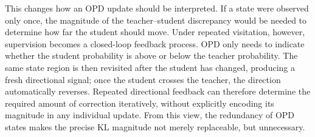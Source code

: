 \documentclass{article}
\theoremstyle{remark}
\begin{document}
This changes how an OPD update should be interpreted. If a state were observed
only once, the magnitude of the teacher--student discrepancy would be needed
to determine how far the student should move. Under repeated visitation,
however, supervision becomes a closed-loop feedback process. OPD only
needs to indicate whether the student probability is above or below the
teacher probability. The same state region is then revisited after the student
has changed, producing a fresh directional signal; once the student crosses
the teacher, the direction automatically reverses. Repeated directional
feedback can therefore determine the required amount of correction
iteratively, without explicitly encoding its magnitude in any individual
update. From this view, the redundancy of OPD states makes the precise KL
magnitude not merely replaceable, but unnecessary.

\end{document}
